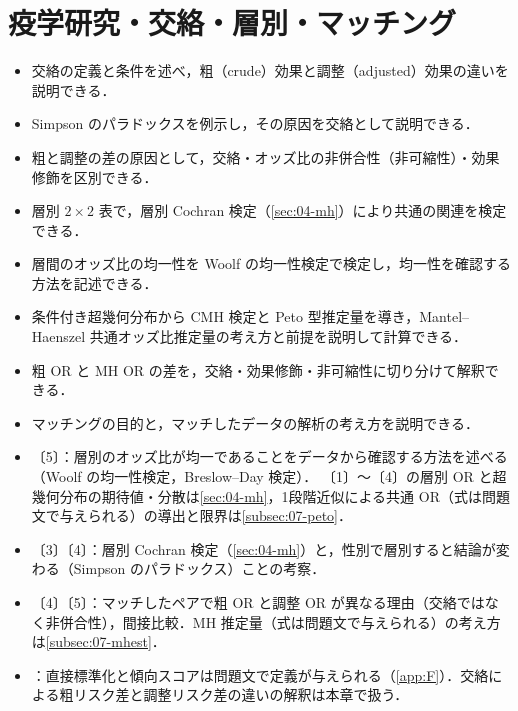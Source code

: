 \chapter{疫学研究・交絡・層別・マッチング}\label{ch:07}

\begin{goalbox}
\begin{itemize}
\item 交絡の定義と条件を述べ，粗（crude）効果と調整（adjusted）効果の違いを説明できる．
\item Simpson のパラドックスを例示し，その原因を交絡として説明できる．
\item 粗と調整の差の原因として，交絡・オッズ比の非併合性（非可縮性）・効果修飾を区別できる．
\item 層別 $2\times2$ 表で，層別 Cochran 検定（\cref{sec:04-mh}）により共通の関連を検定できる．
\item 層間のオッズ比の均一性を Woolf の均一性検定で検定し，均一性を確認する方法を記述できる．
\item 条件付き超幾何分布から CMH 検定と Peto 型推定量を導き，Mantel--Haenszel 共通オッズ比推定量の考え方と前提を説明して計算できる．
\item 粗 OR と MH OR の差を，交絡・効果修飾・非可縮性に切り分けて解釈できる．
\item マッチングの目的と，マッチしたデータの解析の考え方を説明できる．
\end{itemize}
\end{goalbox}

\begin{exambox}
\begin{itemize}
\item {}〔5〕：層別のオッズ比が均一であることをデータから確認する方法を述べる（Woolf の均一性検定，Breslow--Day 検定）．
      〔1〕〜〔4〕の層別 OR と超幾何分布の期待値・分散は\cref{sec:04-mh}，1段階近似による共通 OR（式は問題文で与えられる）の導出と限界は\cref{subsec:07-peto}．
\item {}〔3〕〔4〕：層別 Cochran 検定（\cref{sec:04-mh}）と，性別で層別すると結論が変わる（Simpson のパラドックス）ことの考察．
\item {}〔4〕〔5〕：マッチしたペアで粗 OR と調整 OR が異なる理由（交絡ではなく非併合性），間接比較．MH 推定量（式は問題文で与えられる）の考え方は\cref{subsec:07-mhest}．
\item {}：直接標準化と傾向スコアは問題文で定義が与えられる（\cref{app:F}）．交絡による粗リスク差と調整リスク差の違いの解釈は本章で扱う．
\end{itemize}
\end{exambox}

